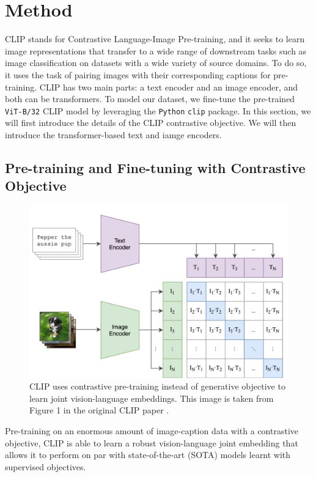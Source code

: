 \section{Method}
CLIP stands for Contrastive Language-Image Pre-training, and it seeks to learn image representations that transfer to a wide range of downstream tasks such as image classification on datasets with a wide variety of source domains. To do so, it uses the task of pairing images with their corresponding captions for pre-training.   
CLIP has two main parts: a text encoder and an image encoder, and both can be transformers. 
To model our dataset, we fine-tune the pre-trained \texttt{ViT-B/32} CLIP model by leveraging the \texttt{Python} \texttt{clip} package. 
In this section, we will first introduce the details of the CLIP contrastive objective. We will then introduce the transformer-based text and iamge encoders. 



\subsection{Pre-training and Fine-tuning with Contrastive Objective} \label{clip.objective}

\begin{figure}[!htb]
\includegraphics[width=0.7\linewidth]{modeling/CLIP.png}  
\caption{CLIP uses contrastive pre-training instead of generative objective to learn joint vision-language embeddings. This image is taken from Figure 1 in the original CLIP paper \citep{CLIPpaper}.}
\label{modeling.clip.pretrainingobj}
\end{figure}

Pre-training on an enormous amount of image-caption data with a contrastive objective, CLIP is able to learn a robust vision-language joint embedding that allows it to perform on par with state-of-the-art (SOTA) models learnt with supervised objectives.   


